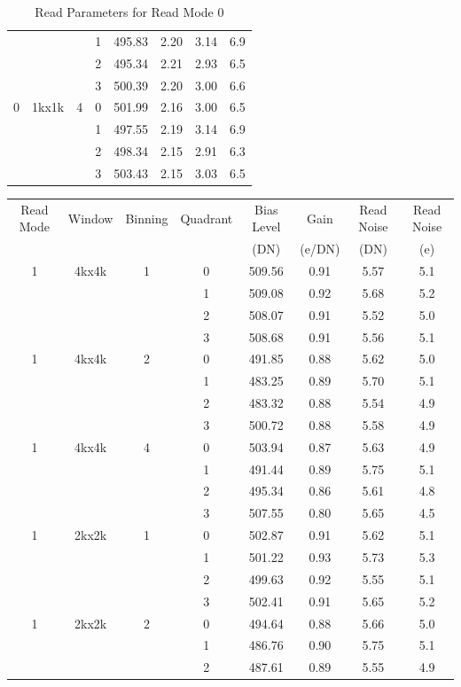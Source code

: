\documentclass{article}
\newcommand{\code}[1]{{\ttfamily #1}}
\begin{document}
\begin{table}
\begin{center}
\begin{tabular}{cccccccc}
&&&1& 495.83& 2.20& 3.14& 6.9\\
&&&2& 495.34& 2.21& 2.93& 6.5\\
&&&3& 500.39& 2.20& 3.00& 6.6\\
0&\code{1kx1k}&4
  &0& 501.99& 2.16& 3.00& 6.5\\
&&&1& 497.55& 2.19& 3.14& 6.9\\
&&&2& 498.34& 2.15& 2.91& 6.3\\
&&&3& 503.43& 2.15& 3.03& 6.5\\
\hline
\end{tabular}
\end{center}
\caption{Read Parameters for Read Mode 0}
\label{table:read-parameters-0}
\end{table}

\begin{table}
\begin{center}\footnotesize
    \begin{tabular}{cccccccc}
    \hline
Read Mode&Window&Binning&Quadrant&Bias Level&Gain&Read Noise&Read Noise\\
&&&&(DN)&(e/DN)&(DN)&(e)\\
\hline
1&\code{4kx4k}&1
  &0& 509.56& 0.91& 5.57& 5.1\\
&&&1& 509.08& 0.92& 5.68& 5.2\\
&&&2& 508.07& 0.91& 5.52& 5.0\\
&&&3& 508.68& 0.91& 5.56& 5.1\\
1&\code{4kx4k}&2
  &0& 491.85& 0.88& 5.62& 5.0\\
&&&1& 483.25& 0.89& 5.70& 5.1\\
&&&2& 483.32& 0.88& 5.54& 4.9\\
&&&3& 500.72& 0.88& 5.58& 4.9\\
1&\code{4kx4k}&4
  &0& 503.94& 0.87& 5.63& 4.9\\
&&&1& 491.44& 0.89& 5.75& 5.1\\
&&&2& 495.34& 0.86& 5.61& 4.8\\
&&&3& 507.55& 0.80& 5.65& 4.5\\
\hline
1&\code{2kx2k}&1
  &0& 502.87& 0.91& 5.62& 5.1\\
&&&1& 501.22& 0.93& 5.73& 5.3\\
&&&2& 499.63& 0.92& 5.55& 5.1\\
&&&3& 502.41& 0.91& 5.65& 5.2\\
1&\code{2kx2k}&2
  &0& 494.64& 0.88& 5.66& 5.0\\
&&&1& 486.76& 0.90& 5.75& 5.1\\
&&&2& 487.61& 0.89& 5.55& 4.9\\

\end{tabular}
\end{center}
\end{table}
\end{document}
